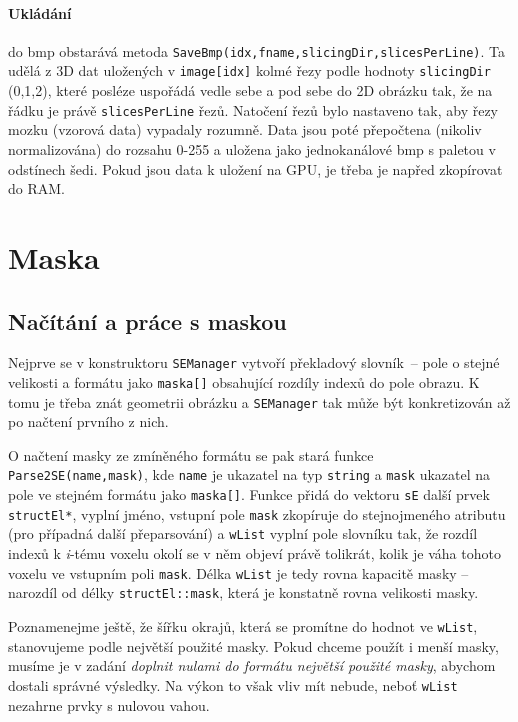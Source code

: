         \paragraph{Ukládání} do bmp obstarává metoda {\tt SaveBmp(idx,fname,slicingDir,slicesPerLine)}. Ta udělá z 3D dat uložených v {\tt image[idx]} kolmé řezy podle hodnoty {\tt slicingDir} (0,1,2), které posléze uspořádá vedle sebe a pod sebe do 2D obrázku tak, že na řádku je právě {\tt slicesPerLine} řezů. Natočení řezů bylo nastaveno tak, aby řezy mozku (vzorová data) vypadaly rozumně. Data jsou poté přepočtena (nikoliv normalizována) do rozsahu 0-255 a uložena jako jednokanálové bmp s paletou v odstínech šedi. Pokud jsou data k uložení na GPU, je třeba je napřed zkopírovat do RAM.


    \section{Maska}
        \subsection{Načítání a práce s maskou}

        Nejprve se v konstruktoru {\tt SEManager} vytvoří překladový \bq slovník\eq~-- pole o stejné velikosti a formátu jako {\tt maska[]} obsahující rozdíly indexů do pole obrazu. K tomu je třeba znát geometrii obrázku a {\tt SEManager} tak může být konkretizován až po načtení prvního z nich.

        O načtení masky ze zmíněného formátu se pak stará funkce {\tt Parse2SE(name,mask)}, kde {\tt name} je ukazatel na typ {\tt string} a {\tt mask} ukazatel na pole ve stejném formátu jako {\tt maska[]}. Funkce přidá do vektoru {\tt sE} další prvek {\tt structEl*}, vyplní jméno, vstupní pole {\tt mask} zkopíruje do stejnojmeného atributu (pro případná další přeparsování) a {\tt wList} vyplní pole slovníku tak, že rozdíl indexů k \textit{i}-tému voxelu okolí se v něm objeví právě tolikrát, kolik je váha tohoto voxelu ve vstupním poli {\tt mask}. Délka {\tt wList} je tedy rovna kapacitě masky -- narozdíl od délky {\tt structEl::mask}, která je konstatně rovna velikosti masky.

        Poznamenejme ještě, že šířku okrajů, která se promítne do hodnot ve {\tt wList}, stanovujeme podle největší použité masky. Pokud chceme použít i menší masky, musíme je v zadání \emph{doplnit nulami do formátu největší použité masky}, abychom dostali správné výsledky. Na výkon to však vliv mít nebude, neboť {\tt wList} nezahrne prvky s nulovou vahou.


